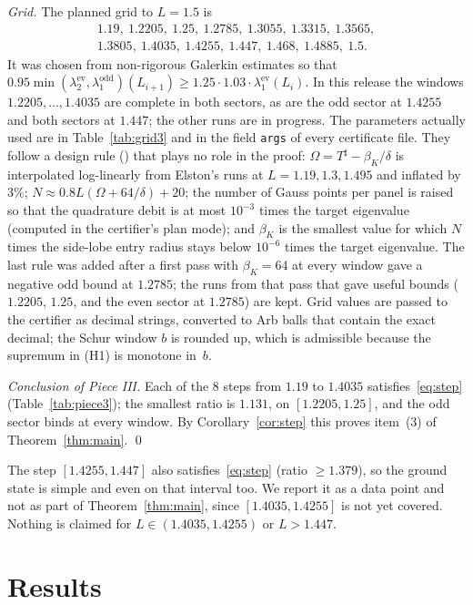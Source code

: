 \documentclass[11pt]{amsart}
\newcommand{\Lmax}{1.4035}                                %
\newcommand{\ev}{\mathrm{ev}}
\newcommand{\od}{\mathrm{odd}}
\newcommand{\Tsh}{T^{\sharp}}
\newcommand{\file}[1]{{\small\path{#1}}}
\theoremstyle{definition}
\theoremstyle{remark}
\numberwithin{equation}{section}
\begin{document}
\emph{Grid.} The planned grid to $L=1.5$ is
\begin{gather*}
1.19,\ 1.2205,\ 1.25,\ 1.2785,\ 1.3055,\ 1.3315,\ 1.3565,\\
1.3805,\ 1.4035,\ 1.4255,\ 1.447,\ 1.468,\ 1.4885,\ 1.5 .
\end{gather*}
It was chosen from non-rigorous Galerkin estimates so that $0.95\min(\lambda_2^\ev,\lambda_1^\od)(L_{i+1})\ge1.25\cdot1.03\cdot\lambda_1^\ev(L_i)$. In this release the windows $1.2205,\dots,\Lmax$ are complete in both sectors, as are the odd sector at $1.4255$ and both sectors at $1.447$; the other runs are in progress. The parameters actually used are in Table~\ref{tab:grid3} and in the field \texttt{args} of every certificate file. They follow a design rule (\file{code/gap/params.py}) that plays no role in the proof: $\Omega=\Tsh-\beta_K/\delta$ is interpolated log-linearly from Elston's runs at $L=1.19,1.3,1.495$ and inflated by $3\%$; $N\approx0.8L(\Omega+64/\delta)+20$; the number of Gauss points per panel is raised so that the quadrature debit is at most $10^{-3}$ times the target eigenvalue (computed in the certifier's plan mode); and $\beta_K$ is the smallest value for which $N$ times the side-lobe entry radius stays below $10^{-6}$ times the target eigenvalue. The last rule was added after a first pass with $\beta_K=64$ at every window gave a negative odd bound at $1.2785$; the runs from that pass that gave useful bounds ($1.2205$, $1.25$, and the even sector at $1.2785$) are kept. Grid values are passed to the certifier as decimal strings, converted to Arb balls that contain the exact decimal; the Schur window $b$ is rounded up, which is admissible because the supremum in (H1) is monotone in~$b$.

\emph{Conclusion of Piece III.} Each of the $8$ steps from $1.19$ to $\Lmax$ satisfies~\eqref{eq:step} (Table~\ref{tab:piece3}); the smallest ratio is $1.131$, on $[1.2205,1.25]$, and the odd sector binds at every window. By Corollary~\ref{cor:step} this proves item~(3) of Theorem~\ref{thm:main}. \qed

The step $[1.4255,1.447]$ also satisfies~\eqref{eq:step} (ratio $\ge1.379$), so the ground state is simple and even on that interval too. We report it as a data point and not as part of Theorem~\ref{thm:main}, since $[1.4035,1.4255]$ is not yet covered. Nothing is claimed for $L\in(\Lmax,1.4255)$ or $L>1.447$.

\section{Results}\label{sec:results}
\end{document}
